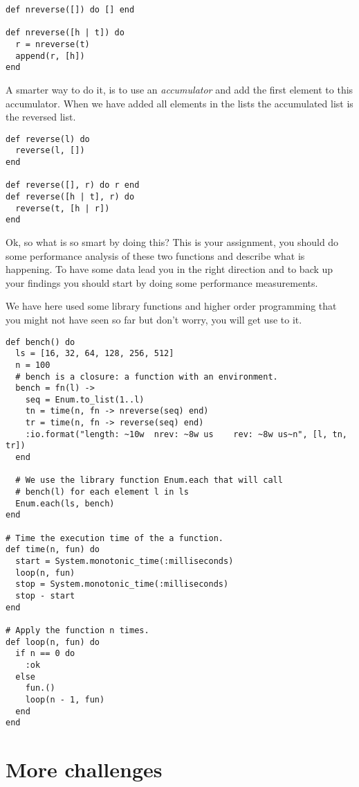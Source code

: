 \documentclass[a4paper,11pt]{article}
\begin{document}
\begin{verbatim}
def nreverse([]) do [] end

def nreverse([h | t]) do
  r = nreverse(t)
  append(r, [h])
end
\end{verbatim}

A smarter way to do it, is to use an {\em accumulator} and add the
first element to this accumulator. When we have added all elements in
the lists the accumulated list is the reversed list.

\begin{verbatim}
def reverse(l) do
  reverse(l, [])
end

def reverse([], r) do r end
def reverse([h | t], r) do
  reverse(t, [h | r])
end
\end{verbatim}

Ok, so what is so smart by doing this? This is your assignment, you
should do some performance analysis of these two functions and
describe what is happening. To have some data lead you in the right
direction and to back up your findings you should start by doing some
performance measurements.

We have here used some library functions and higher order programming
that you might not have seen so far but don't worry, you will get use
to it.

\begin{verbatim}
def bench() do
  ls = [16, 32, 64, 128, 256, 512]
  n = 100
  # bench is a closure: a function with an environment.
  bench = fn(l) ->
    seq = Enum.to_list(1..l)
    tn = time(n, fn -> nreverse(seq) end)
    tr = time(n, fn -> reverse(seq) end)
    :io.format("length: ~10w  nrev: ~8w us    rev: ~8w us~n", [l, tn, tr])
  end

  # We use the library function Enum.each that will call
  # bench(l) for each element l in ls
  Enum.each(ls, bench)
end

# Time the execution time of the a function.
def time(n, fun) do
  start = System.monotonic_time(:milliseconds)
  loop(n, fun)
  stop = System.monotonic_time(:milliseconds)
  stop - start
end

# Apply the function n times.
def loop(n, fun) do
  if n == 0 do
    :ok
  else
    fun.()
    loop(n - 1, fun)
  end
end
\end{verbatim}



\section{More challenges}
\end{document}
